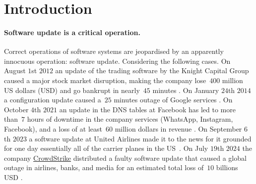 \newcommand{\erlang}{\href{https://www.erlang.org/faq/introduction.html}{\textsf{Erlang}}\xspace}
\newcommand{\elixir}{\href{https://elixir-lang.org/}{\textsf{Elixir}}\xspace}


\section{Introduction}
\label{sec:intro}

\paragraph{Software update is a critical operation.}
Correct operations of software systems are jeopardised by an
apparently innocuous operation:
software update. Considering the following cases. %
On August $1$st $2012$ an update of the trading software by the Knight
Capital Group caused a major stock market disruption, making the
company lose~$400$ million US dollars (USD) and go bankrupt in
nearly~$45$ minutes \cite{knightmare,WkKnightmare}.
On January $24$th $2014$ a configuration update caused a~$25$ minutes
outage of Google services \cite{WkGoogle}.
On October $4$th $2021$ an update in the DNS tables at Facebook has led
to more than~$7$ hours of downtime in the company services (WhatsApp,
Instagram, Facebook), and a loss of at least~$60$ million
dollars in revenue \cite{facebook}.
On September $6$th $2023$ a software update at
United Airlines made it to the news for it grounded for one day
essentially all of the carrier planes in the
US~\cite{update-grounded-flights}.
On July $19$th $2024$ the company \href{https://www.crowdstrike.com/}{CrowdStrike} 
distributed a faulty software update that caused a global outage
in airlines, banks, and media for an estimated total loss of~$10$
billions USD \cite{WkCrowd}.



